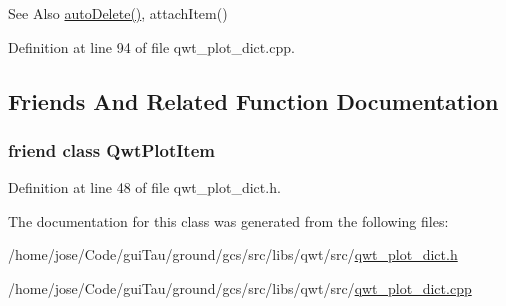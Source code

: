 \begin{DoxySeeAlso}{See Also}
\hyperlink{class_qwt_plot_dict_a10dfae8b454fa4258b0372366013507a}{auto\-Delete()}, attach\-Item() 
\end{DoxySeeAlso}


Definition at line 94 of file qwt\-\_\-plot\-\_\-dict.\-cpp.



\subsection{Friends And Related Function Documentation}
\hypertarget{class_qwt_plot_dict_a055bada44394b2c38d0d907087a14fa3}{
\subsubsection[{Qwt\-Plot\-Item}]{\setlength{\rightskip}{0pt plus 5cm}friend class {\bf Qwt\-Plot\-Item}\hspace{0.3cm}{\ttfamily [friend]}}}\label{class_qwt_plot_dict_a055bada44394b2c38d0d907087a14fa3}


Definition at line 48 of file qwt\-\_\-plot\-\_\-dict.\-h.



The documentation for this class was generated from the following files\-:\begin{DoxyCompactItemize}
\item 
/home/jose/\-Code/gui\-Tau/ground/gcs/src/libs/qwt/src/\hyperlink{qwt__plot__dict_8h}{qwt\-\_\-plot\-\_\-dict.\-h}\item 
/home/jose/\-Code/gui\-Tau/ground/gcs/src/libs/qwt/src/\hyperlink{qwt__plot__dict_8cpp}{qwt\-\_\-plot\-\_\-dict.\-cpp}\end{DoxyCompactItemize}
